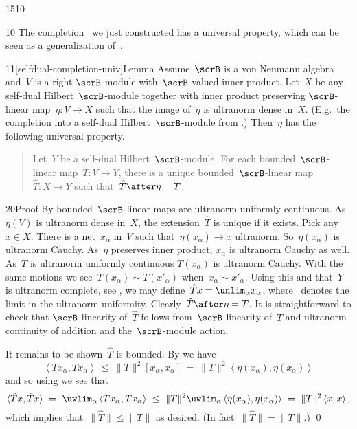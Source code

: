 \begin{parsec}{1510}%
\begin{point}{10}%
The completion~ we just constructed
    has a universal property,
    which can be seen as a generalization of~\cite[prop.~3.6]{paschke}.
\end{point}
\begin{point}{11}[selfdual-completion-univ]{Lemma}%
Assume~$\scrB$ is a von Neumann algebra
    and~$V$ is a right $\scrB$-module
    with~$\scrB$-valued inner product.
Let~$X$ be any self-dual Hilbert~$\scrB$-module
    together with inner product preserving
    $\scrB$-linear map~$\eta\colon V \to X$
    such that the image of~$\eta$ is ultranorm dense in~$X$.
(E.g.~the completion into a self-dual Hilbert~$\scrB$-module
from .)
Then~$\eta$ has the following universal property.
\begin{quote}
Let~$Y$ be a self-dual Hilbert~$\scrB$-module.
For each bounded~$\scrB$-linear
    map~$T\colon V \to Y$,
    there is a unique bounded~$\scrB$-linear
    map~$\hat{T} \colon X \to Y$
    such that~$\hat{T} \after \eta = T$.
\end{quote}
    \spacingfix{}
\begin{point}{20}{Proof}%
By  bounded~$\scrB$-linear
    maps are ultranorm uniformly continuous.
As~$\eta(V)$ is ultranorm dense in~$X$,
    the extension~$\hat{T}$ is unique if it exists.
Pick any~$x \in X$.
There is a net~$x_\alpha$ in~$V$ such
    that~$\eta(x_\alpha) \to x$ ultranorm.
So~$\eta(x_\alpha)$ is ultranorm Cauchy.
As~$\eta$ preserves inner product,
    $x_\alpha$ is ultranorm Cauchy as well.
As~$T$ is ultranorm uniformly continuous
    $T(x_\alpha)$ is ultranorm Cauchy.
With the same motions we see~$T(x_\alpha) \sim T(x'_\alpha)$
    when~$x_\alpha \sim x'_\alpha$.
Using this and that~$Y$ is ultranorm complete, see ,
    we may define~$\hat{T} x = \unlim_\alpha x_\alpha$,
    where~\Define{$\unlim$} denotes the limit in the ultranorm uniformity.
Clearly~$\hat{T}\after\eta=T$.
It is straightforward to check
    that $\scrB$-linearity
    of~$\hat{T}$
    follows from~$\scrB$-linearity of~$T$
    and ultranorm continuity of addition and
        the~$\scrB$-module action.

It remains to be shown~$\hat{T}$ is bounded.
By   we have
\begin{equation*}
\left<T x_\alpha,T x_\alpha\right>
\ \leq\  \| T\|^2 [x_\alpha,x_\alpha]
\ =\  \|T\|^2 \left<\eta(x_\alpha),\eta(x_\alpha)\right>
\end{equation*}
and so using  we see that
\begin{equation*}
\langle\hat{T} x, \hat{T} x\rangle \ =\ 
\uwlim_\alpha \left<T x_\alpha, T x_\alpha\right>
            \ \leq \ \|T\|^2 \uwlim_\alpha \left<\eta(x_\alpha), \eta(x_\alpha)\right>
            \ =\  \|T\|^2 \left<x,x\right>,
\end{equation*}
which implies that~$\|\hat{T}\| \leq \|T\|$ as desired.
(In fact~$\|\hat{T}\| = \|T\|$.) \qed
\end{point}
\end{point}
\end{parsec}
